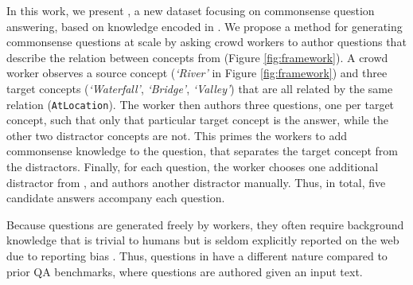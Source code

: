  In this work, we present \csqa{}, a new dataset focusing on commonsense question answering, based on knowledge encoded in \conceptnet{} \cite{speer2017conceptnet}. We propose a method for generating commonsense questions at scale by asking crowd workers to author questions that describe the relation between concepts from  \conceptnet{} (Figure \ref{fig:framework}). A crowd worker observes a source concept (\emph{`River'} in Figure  \ref{fig:framework}) and three target concepts (\emph{`Waterfall'}, \emph{`Bridge'}, \emph{`Valley'}) that are all related by the same \conceptnet{} relation (\texttt{AtLocation}). The worker then authors three questions, one per target concept, such that only that particular target concept is the answer, while the other two distractor concepts are not. This primes the workers to add commonsense knowledge to the question, that separates the target concept from the distractors. Finally, for each question, the worker chooses one additional distractor from \conceptnet{}, and authors another distractor manually. Thus, in total, five candidate answers accompany each question.

Because questions are generated freely by workers, they often require background knowledge that is trivial to humans but is seldom explicitly reported on the web due to reporting bias \cite{Gordon:2013:RBK:2509558.2509563}. Thus, questions in \csqa{} have a different nature compared to prior QA benchmarks, where questions are authored given an input text.

